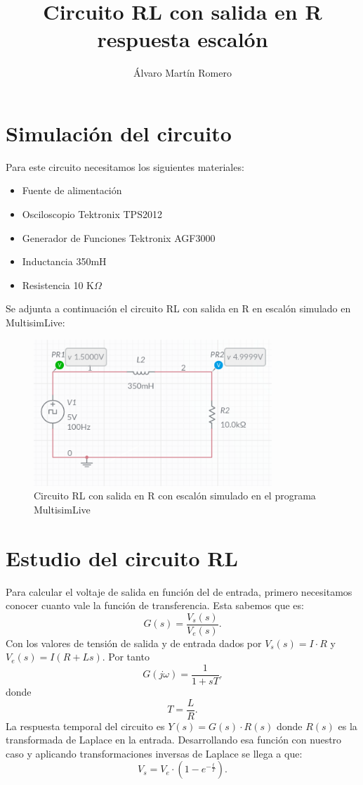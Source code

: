 \documentclass[11pt,letterpaper]{article}
\title{Circuito RL con salida en R respuesta escalón}
\author{Álvaro Martín Romero}
\begin{document}
\maketitle	
\section{Simulación del circuito}%
\label{sec:Simulación del circuito}
Para este circuito necesitamos los siguientes materiales:
\begin{itemize}
	\item Fuente de alimentación
	\item Osciloscopio Tektronix TPS2012
	\item Generador de Funciones Tektronix AGF3000
	\item Inductancia 350mH
	\item Resistencia 10 K$\Omega$
\end{itemize}
Se adjunta a continuación el circuito RL con salida en R en escalón simulado en MultisimLive:
\begin{figure}[H]
	\centering
	\includegraphics[width=0.8\textwidth]{imagen/circuitoRL_Rescalon.png}
	\caption{Circuito RL con salida en R con escalón simulado en el programa MultisimLive}
	\label{fig:imagen-circuitoRL}
\end{figure}
\section{Estudio del circuito RL}%
\label{sec:Estudio del circuito RL}
Para calcular el voltaje de salida en función del de entrada, primero necesitamos conocer cuanto vale la función de transferencia. Esta sabemos que es:
\[
	G\left( s \right) =\frac{V_s(s)}{V_e(s)}
.\] 
Con los valores de tensión de salida y de entrada dados por $V_s\left( s \right) =I\cdot R$ y $V_e\left( s \right) =I\left( R+Ls \right) $. Por tanto
\[
	G\left( j\omega \right) =\frac{1}{1+sT}
.\] 
donde \[
T=\frac{L}{R}
.\] 
La respuesta temporal del circuito es $Y(s)=G(s)\cdot R(s)$ donde $R(s)$ es la transformada de Laplace en la entrada. Desarrollando esa función con nuestro caso y aplicando transformaciones inversas de Laplace se llega a que:
\[
	V_{s}=V_e\cdot \left( 1-e^{-\frac{t}{T}} \right) 
.\] 
\end{document}

